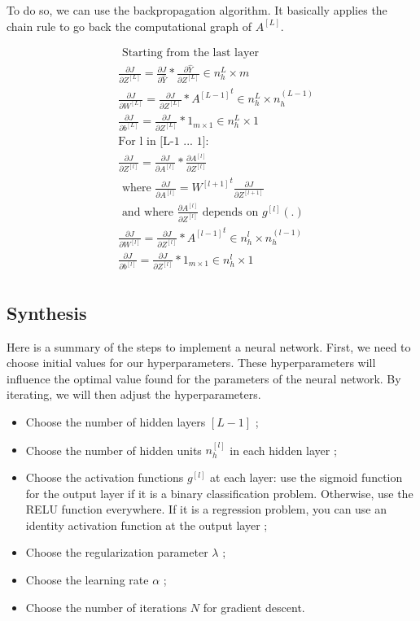 \documentclass[a4paper, 12pt]{article}
\begin{document}
To do so, we can use the backpropagation algorithm. It basically applies the chain rule to go back the computational graph of $A^{[L]}$.

\begin{align*}
& \text{ Starting from the last layer } \\
& \frac{\partial J}{\partial Z^{[L]}} = \frac{\partial J}{\partial \hat{Y}} * \frac{\partial \hat{Y}}{\partial Z^{[L]}} \in n_h^L \times m \\
& \frac{\partial J}{\partial W^{[L]}} = \frac{\partial J}{\partial Z^{[L]}} * {A^{[L-1]}}^{t} \in n_h^L \times n_h^{(L-1)} \\
& \frac{\partial J}{\partial b^{[L]}} = \frac{\partial J}{\partial Z^{[L]}} * 1_{m\times1} \in n_h^L \times 1 \\
& \text{For l in [L-1 ... 1]:} \\
& \frac{\partial J}{\partial Z^{[l]}} = \frac{\partial J}{\partial A^{[l]}} * \frac{\partial A^{[l]}}{\partial Z^{[l]}} \\
& \text{ where } \frac{\partial J}{\partial A^{[l]}} = {W^{[l+1]}}^{t} \frac{\partial J}{\partial Z^{[l+1]}} \\
& \text{ and where } \frac{\partial A^{[l]}}{\partial Z^{[l]}} \text{ depends on } g^{[l]}(.) \\
& \frac{\partial J}{\partial W^{[l]}} = \frac{\partial J}{\partial Z^{[l]}} * {A^{[l-1]}}^{t} \in n_h^{l} \times n_h^{(l-1)} \\
& \frac{\partial J}{\partial b^{[l]}} = \frac{\partial J}{\partial Z^{[l]}} * 1_{m\times1} \in n_h^l \times 1 \\
\end{align*}

\subsection{Synthesis}

Here is a summary of the steps to implement a neural network. First, we need to choose initial values for our hyperparameters. These hyperparameters will influence the optimal value found for the parameters of the neural network. By iterating, we will then adjust the hyperparameters.

\begin{itemize}
\item Choose the number of hidden layers $[L-1]$ ;
\item Choose the number of hidden units $n^{[l]}_h$ in each hidden layer ;
\item Choose the activation functions $g^{[l]}$ at each layer: use the sigmoid function for the output layer if it is a binary classification problem. Otherwise, use the RELU function everywhere. If it is a regression problem, you can use an identity activation function at the output layer ;
\item Choose the regularization parameter $\lambda$ ;
\item Choose the learning rate $\alpha$ ;
\item Choose the number of iterations $N$ for gradient descent.
\end{itemize}
\end{document}
